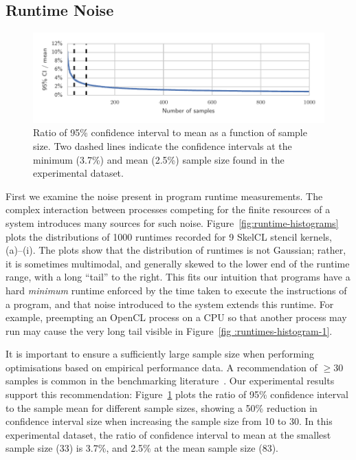 \documentclass[nonatbib,preprint,nocopyrightspace,9pt]{sigplanconf}
\begin{document}
\subsection{Runtime Noise}

\begin{figure}
\centering
\includegraphics[width=\columnwidth]{img/ci_trend}
\caption{%
  Ratio of 95\% confidence interval to mean as a function of sample size. Two
  dashed lines indicate the confidence intervals at the minimum (3.7\%) and mean
  (2.5\%) sample size found in the experimental dataset.%
}
\label{fig:ci-trends}
\end{figure}

First we examine the noise present in program runtime measurements. The complex
interaction between processes competing for the finite resources of a system
introduces many sources for such noise. Figure~\ref{fig:runtime-histograms}
plots the distributions of 1000 runtimes recorded for 9 SkelCL stencil kernels,
(a)--(i). The plots show that the distribution of runtimes is not Gaussian;
rather, it is sometimes multimodal, and generally skewed to the lower end of the
runtime range, with a long ``tail'' to the right. This fits our intuition that
programs have a hard \emph{minimum} runtime enforced by the time taken to
execute the instructions of a program, and that noise introduced to the system
extends this runtime. For example, preempting an OpenCL process on a CPU so that
another process may run may cause the very long tail visible in Figure~\ref{fig
:runtimes-histogram-1}.

It is important to ensure a sufficiently large sample size when performing
optimisations based on empirical performance data. A recommendation of $\ge 30$
samples is common in the benchmarking literature~\cite{Georges2007}. Our
experimental results support this recommendation: Figure~\ref{fig:ci-trends}
plots the ratio of 95\% confidence interval to the sample mean for different
sample sizes, showing a 50\% reduction in confidence interval size when
increasing the sample size from 10 to 30. In this experimental dataset, the
ratio of confidence interval to mean at the smallest sample size (33) is 3.7\%,
and 2.5\% at the mean sample size (83).
\end{document}
